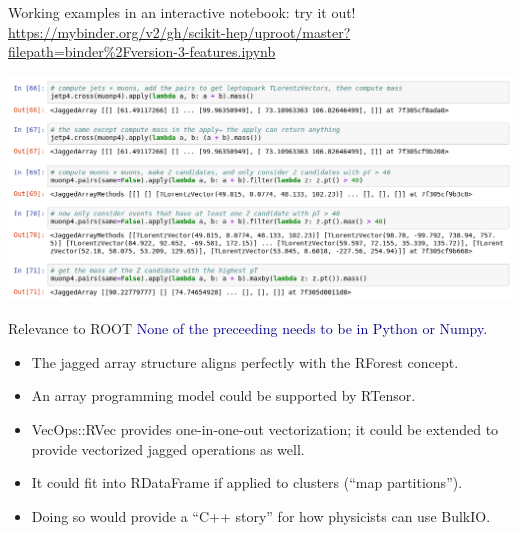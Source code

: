 \documentclass[aspectratio=169]{beamer}
\begin{document}
\begin{frame}{Working examples in an interactive notebook: try it out!}
\vspace{0.25 cm}
\textcolor{blue}{\small\url{https://mybinder.org/v2/gh/scikit-hep/uproot/master?filepath=binder\%2Fversion-3-features.ipynb}}

\vspace{0.15 cm}
\includegraphics[width=\linewidth]{tutorial-screenshot.png}
\end{frame}

\begin{frame}{Relevance to ROOT}
\large
\vspace{0.5 cm}
\textcolor{darkblue}{\Large None of the preceeding needs to be in Python or Numpy.}

\vspace{0.5 cm}

\vspace{0.5 cm}
\begin{itemize}
\item<3-> The jagged array structure aligns perfectly with the RForest concept.
\item<4-> An array programming model could be supported by RTensor.
\item<5-> VecOps::RVec provides one-in-one-out vectorization; it could be extended to provide vectorized jagged operations as well.
\item<6-> It could fit into RDataFrame if applied to clusters (``map partitions'').
\item<7-> Doing so would provide a ``C++ story'' for how physicists can use BulkIO.
\end{itemize}
\end{frame}
\end{document}
